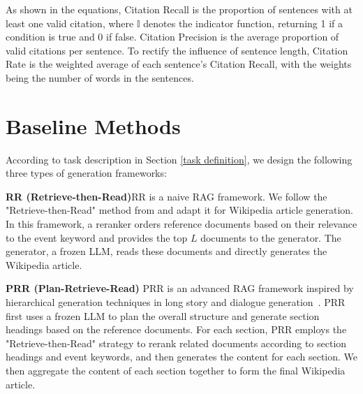 \documentclass[11pt]{article}
\begin{document}
As shown in the equations, Citation Recall is the proportion of sentences with at least one valid citation, where $\mathbb{I}$ denotes the indicator function, returning 1 if a condition is true and 0 if false. Citation Precision is the average proportion of valid citations per sentence. To rectify the influence of sentence length, Citation Rate is the weighted average of each sentence's Citation Recall, with the weights being the number of words in the sentences. 

\section{Baseline Methods}
According to task description in Section \ref{task definition}, we design the following three types of generation frameworks: 


\noindent \textbf{RR (Retrieve-then-Read)}\quad RR is a naive RAG framework. We follow the "Retrieve-then-Read" method from \citet{ma2023query} and adapt it for Wikipedia article generation. In this framework, a reranker orders reference documents based on their relevance to the event keyword and provides the top $L$ documents to the generator. The generator, a frozen LLM, reads these documents and directly generates the Wikipedia article.

\noindent \textbf{PRR (Plan-Retrieve-Read)}\quad
PRR is an advanced RAG framework inspired by hierarchical generation techniques in long story and dialogue generation~\cite{fan-etal-2018-hierarchical, bansal-etal-2022-r3}. PRR first uses a frozen LLM to plan the overall structure and generate section headings based on the reference documents. For each section, PRR employs the "Retrieve-then-Read" strategy to rerank related documents according to section headings and event keywords, and then generates the content for each section. We then aggregate the content of each section together to form the final Wikipedia article. 
\end{document}
